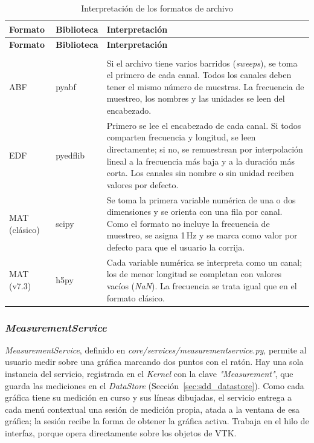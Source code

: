 \documentclass[12pt,letterpaper,oneside]{article}
\DeclareRobustCommand{\_}{\textunderscore\allowbreak}
\begin{document}
\begin{center}
\small
\begin{longtable}{|p{}|p{}|p{}|}
\hline
\textbf{Formato} & \textbf{Biblioteca} & \textbf{Interpretación} \\
\hline
\endfirsthead
\hline
\textbf{Formato} & \textbf{Biblioteca} & \textbf{Interpretación} \\
\hline
\endhead
\hline
\endfoot
\hline
\caption{Interpretación de los formatos de archivo} \label{tab:sdd_formatos} \\
\endlastfoot
ABF & pyabf & Si el archivo tiene varios barridos (\textit{sweeps}), se toma el primero de cada canal. Todos los canales deben tener el mismo número de muestras. La frecuencia de muestreo, los nombres y las unidades se leen del encabezado. \\
\hline
EDF & pyedflib & Primero se lee el encabezado de cada canal. Si todos comparten frecuencia y longitud, se leen directamente; si no, se remuestrean por interpolación lineal a la frecuencia más baja y a la duración más corta. Los canales sin nombre o sin unidad reciben valores por defecto. \\
\hline
MAT (clásico) & scipy & Se toma la primera variable numérica de una o dos dimensiones y se orienta con una fila por canal. Como el formato no incluye la frecuencia de muestreo, se asigna 1\,Hz y se marca como valor por defecto para que el usuario la corrija. \\
\hline
MAT (v7.3) & h5py & Cada variable numérica se interpreta como un canal; los de menor longitud se completan con valores vacíos (\textit{NaN}). La frecuencia se trata igual que en el formato clásico. \\
\hline
\end{longtable}
\end{center}

\subsubsection{\textit{MeasurementService}}
\label{sec:sdd_measurement}

\textit{MeasurementService}, definido en \textit{core/services/measurement\_service.py}, permite al usuario medir sobre una gráfica marcando dos puntos con el ratón. Hay una sola instancia del servicio, registrada en el \textit{Kernel} con la clave \textit{"Measurement"}, que guarda las mediciones en el \textit{DataStore} (Sección~\ref{sec:sdd_datastore}). Como cada gráfica tiene su medición en curso y sus líneas dibujadas, el servicio entrega a cada menú contextual una sesión de medición propia, atada a la ventana de esa gráfica; la sesión recibe la forma de obtener la gráfica activa. Trabaja en el hilo de interfaz, porque opera directamente sobre los objetos de VTK.
\end{document}
